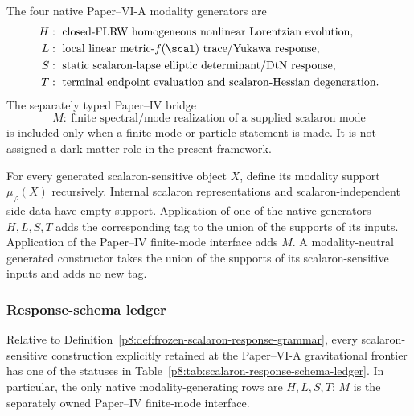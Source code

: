 \documentclass[12pt,a4paper]{article}
\begin{document}
\begin{definition}
\label{p8:def:scalaron-native-modality-generators}
The four native Paper--VI-A modality generators are
\begin{align*}
H&:\ \text{closed-FLRW homogeneous nonlinear Lorentzian evolution},\\
L&:\ \text{local linear metric-}f(\scal)\text{ trace/Yukawa response},\\
S&:\ \text{static scalaron-lapse elliptic determinant/DtN response},\\
T&:\ \text{terminal endpoint evaluation and scalaron-Hessian degeneration}.
\end{align*}
The separately typed Paper--IV bridge
\[
M:\ \text{finite spectral/mode realization of a supplied scalaron mode}
\]
is included only when a finite-mode or particle statement is made.
It is not assigned a dark-matter role in the present framework.
\end{definition}

\begin{definition}
\label{p8:def:scalaron-modality-support}
For every generated scalaron-sensitive object $X$, define its modality support
$\mu_{\varphi}(X)$ recursively.  Internal scalaron representations and
scalaron-independent side data have empty support.  Application of one of the
native generators $H,L,S,T$ adds the corresponding tag to the union of the
supports of its inputs.  Application of the Paper--IV finite-mode interface
adds $M$.  A modality-neutral generated constructor takes the union of the
supports of its scalaron-sensitive inputs and adds no new tag.
\end{definition}

\subsubsection{Response-schema ledger}

\begin{proposition}
\label{p8:prop:complete-scalaron-response-ledger}
Relative to Definition~\ref{p8:def:frozen-scalaron-response-grammar}, every
scalaron-sensitive construction explicitly retained at the Paper--VI-A
gravitational frontier has one of the statuses in
Table~\ref{p8:tab:scalaron-response-schema-ledger}.  In particular, the only
native modality-generating rows are $H,L,S,T$; $M$ is the separately owned
Paper--IV finite-mode interface.
\end{proposition}
\end{document}
